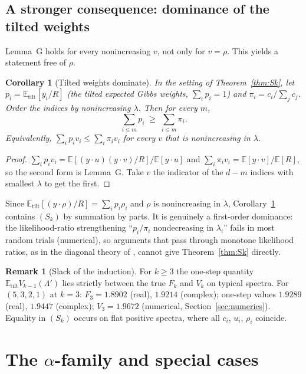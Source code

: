 \documentclass[11pt,a4paper]{article}
\newtheorem{corollary}[theorem]{Corollary}
\theoremstyle{definition}
\newtheorem{remark}[theorem]{Remark}
\newcommand{\E}{\mathbb{E}}
\newcommand{\tilt}{\mathrm{tilt}}
\begin{document}
\subsection{A stronger consequence: dominance of the tilted weights}
Lemma~G holds for every nonincreasing $v$, not only for $v=\rho$. This yields a statement free of $\rho$.

\begin{corollary}[Tilted weights dominate]\label{cor:condD}
In the setting of Theorem~\ref{thm:Sk}, let $p_i=\E_\tilt[y_i/R]$ (the tilted expected Gibbs weights, $\sum_ip_i=1$) and $\pi_i=c_i/\sum_jc_j$. Order the indices by nonincreasing $\lambda$. Then for every $m$,
\[
\sum_{i\le m}p_i\;\ge\;\sum_{i\le m}\pi_i .
\]
Equivalently, $\sum_ip_iv_i\le\sum_i\pi_iv_i$ for every $v$ that is nonincreasing in $\lambda$.
\end{corollary}

\begin{proof}
$\sum_ip_iv_i=\E[(y\cdot u)(y\cdot v)/R]/\E[y\cdot u]$ and $\sum_i\pi_iv_i=\E[y\cdot v]/\E[R]$, so the second form is Lemma~G. Take $v$ the indicator of the $d-m$ indices with smallest $\lambda$ to get the first.
\end{proof}

Since $\E_\tilt[(y\cdot\rho)/R]=\sum_ip_i\rho_i$ and $\rho$ is nonincreasing in $\lambda$, Corollary~\ref{cor:condD} contains $(S_k)$ by summation by parts. It is genuinely a first-order dominance: the likelihood-ratio strengthening ``$p_i/\pi_i$ nondecreasing in $\lambda_i$'' fails in most random trials (numerical), so arguments that pass through monotone likelihood ratios, as in the diagonal theory of \cite{Yu}, cannot give Theorem~\ref{thm:Sk} directly.

\begin{remark}[Slack of the induction]\label{rem:slack}
For $k\ge3$ the one-step quantity $\E_\tilt V_{k-1}(\Lambda')$ lies strictly between the true $F_k$ and $V_k$ on typical spectra. For $(5,3,2,1)$ at $k=3$: $F_3=1.8902$ (real), $1.9214$ (complex); one-step values $1.9289$ (real), $1.9447$ (complex); $V_3=1.9672$ (numerical, Section~\ref{sec:numerics}). Equality in $(S_k)$ occurs on flat positive spectra, where all $c_i$, $u_i$, $\rho_i$ coincide.
\end{remark}
\section{The $\alpha$-family and special cases}\label{sec:family}
\end{document}

